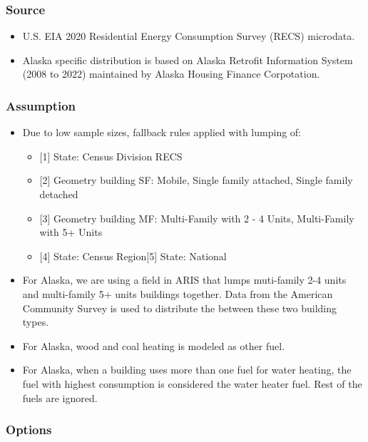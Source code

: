 \subsubsection{Source}\label{source-149}

\begin{itemize}
 
\item
  U.S. EIA 2020 Residential Energy Consumption Survey (RECS) microdata.
\item
  Alaska specific distribution is based on Alaska Retrofit Information
  System (2008 to 2022) maintained by Alaska Housing Finance
  Corpotation.
\end{itemize}

\subsubsection{Assumption}\label{assumption-84}

\begin{itemize}
 
\item
  Due to low sample sizes, fallback rules applied with lumping of:

  \begin{itemize}
   
  \item
    {[}1{]} State: Census Division RECS
  \item
    {[}2{]} Geometry building SF: Mobile, Single family attached, Single
    family detached
  \item
    {[}3{]} Geometry building MF: Multi-Family with 2 - 4 Units,
    Multi-Family with 5+ Units
  \item
    {[}4{]} State: Census Region{[}5{]} State: National
  \end{itemize}
\item
  For Alaska, we are using a field in ARIS that lumps muti-family 2-4
  units and multi-family 5+ units buildings together. Data from the
  American Community Survey is used to distribute the between these two
  building types.
\item
  For Alaska, wood and coal heating is modeled as other fuel.
\item
  For Alaska, when a building uses more than one fuel for water heating,
  the fuel with highest consumption is considered the water heater fuel.
  Rest of the fuels are ignored.
\end{itemize}

\subsubsection{Options}\label{options-150}

